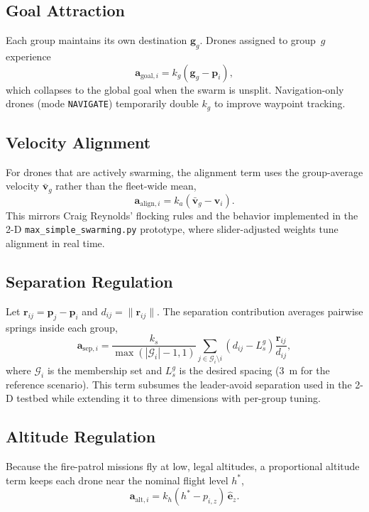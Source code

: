 \documentclass[conference]{AIAA}
\begin{document}
\subsection{Goal Attraction}
Each group maintains its own destination \(\mathbf{g}_g\).  Drones assigned to group~$g$ experience
\begin{equation}
	\mathbf{a}_{\text{goal},i} = k_g (\mathbf{g}_g - \mathbf{p}_i),
\end{equation}
which collapses to the global goal when the swarm is unsplit.  Navigation-only drones (mode \texttt{NAVIGATE}) temporarily double \(k_g\) to improve waypoint tracking.

\subsection{Velocity Alignment}
For drones that are actively swarming, the alignment term uses the group-average velocity \(\bar{\mathbf{v}}_g\) rather than the fleet-wide mean,
\begin{equation}
	\mathbf{a}_{\text{align},i} = k_a (\bar{\mathbf{v}}_g - \mathbf{v}_i).
\end{equation}
This mirrors Craig Reynolds' flocking rules and the behavior implemented in the 2-D \texttt{max\_simple\_swarming.py} prototype, where slider-adjusted weights tune alignment in real time.

\subsection{Separation Regulation}
Let \(\mathbf{r}_{ij} = \mathbf{p}_j - \mathbf{p}_i\) and \(d_{ij}=\lVert \mathbf{r}_{ij} \rVert\).  The separation contribution averages pairwise springs inside each group,
\begin{equation}
	\mathbf{a}_{\text{sep},i} = \frac{k_s}{\max(|\mathcal{G}_i|-1,1)} \sum_{j \in \mathcal{G}_i \setminus i} (d_{ij} - L_s^g) \frac{\mathbf{r}_{ij}}{d_{ij}},
\end{equation}
where \(\mathcal{G}_i\) is the membership set and \(L_s^g\) is the desired spacing (\SI{3}{m} for the reference scenario).  This term subsumes the leader-avoid separation used in the 2-D testbed while extending it to three dimensions with per-group tuning.

\subsection{Altitude Regulation}
Because the fire-patrol missions fly at low, legal altitudes, a proportional altitude term keeps each drone near the nominal flight level \(h^*\),
\begin{equation}
	\mathbf{a}_{\text{alt},i} = k_h (h^* - p_{i,z}) \, \hat{\mathbf{e}}_z.
\end{equation}
\end{document}
